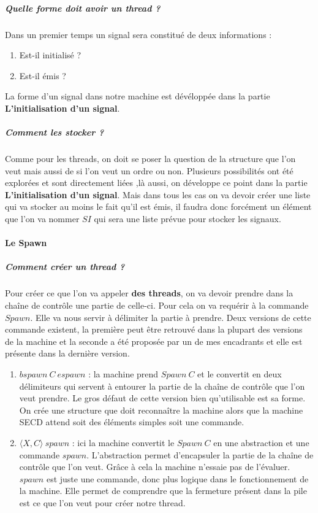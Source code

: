 \documentclass[10pt,a4paper]{report}
\begin{document}
\subparagraph{Quelle forme doit avoir un thread ?} 
Dans un premier temps un signal sera constitué de deux informations : 
\begin{enumerate}
\item Est-il initialisé ?
\item Est-il émis ?
\end{enumerate}
La forme d'un signal dans notre machine est dévéloppée dans la partie \textbf{L'initialisation d'un signal}.

\subparagraph{Comment les stocker ?}
Comme pour les threads, on doit se poser la question de la structure que l'on veut mais aussi de si l'on veut un ordre ou non. Plusieurs possibilités ont été explorées et sont directement liées ,là aussi, on développe ce point dans la partie \textbf{L'initialisation d'un signal}. Mais dans tous les cas on va devoir créer une liste qui va stocker au moins le fait qu'il est émis, il faudra donc forcément un élément que l'on va nommer $SI$ qui sera une liste prévue pour stocker les signaux.
\bigbreak 


\paragraph{Le Spawn} 

\subparagraph{Comment créer un thread ?}
Pour créer ce que l'on va appeler \textbf{des threads}, on va devoir prendre dans la chaîne de contrôle une partie de celle-ci. Pour cela on va requérir à la commande $Spawn$. Elle va nous servir à délimiter la partie à prendre. Deux versions de cette commande existent, la première peut être retrouvé dans la plupart des versions de la machine et la seconde a été proposée par un de mes encadrants et elle est présente dans la dernière version.
\smallbreak
\begin{enumerate}
\item $bspawn~C~espawn$ : la machine prend $Spawn~C$ et le convertit en deux délimiteurs qui servent à entourer la partie de la chaîne de contrôle que l'on veut prendre. Le gros défaut de cette version bien qu'utilisable est sa forme. On crée une structure que doit reconnaître la machine alors que la machine SECD attend soit des éléments simples soit une commande.
\item $\langle X,C\rangle~spawn$ : ici la machine convertit le $Spawn~C$ en une abstraction et une commande $spawn$. L'abstraction permet d'encapsuler la partie de la chaîne de contrôle que l'on veut. Grâce à cela la machine n'essaie pas de l'évaluer. $spawn$ est juste une commande, donc plus logique dans le fonctionnement de la machine. Elle permet de comprendre que la fermeture présent dans la pile est ce que l'on veut pour créer notre thread. 
\end{enumerate}
\medbreak
\end{document}
